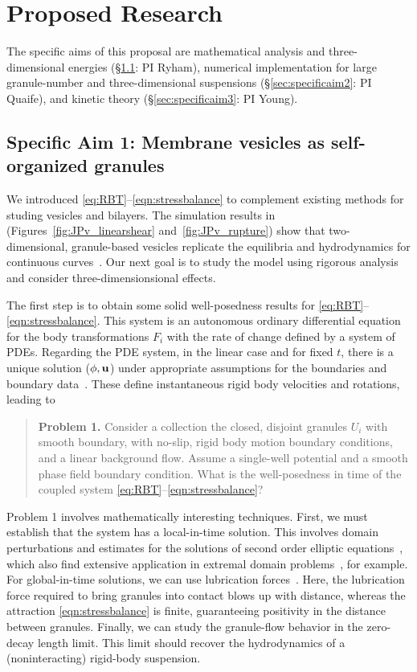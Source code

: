\section{Proposed Research}
\label{sec:proposed-work}
The specific aims of this proposal are
mathematical analysis and three-dimensional energies
(\S \ref{sec:specificaim1}: PI Ryham),
numerical implementation for large granule-number
and three-dimensional suspensions
(\S \ref{sec:specificaim2}: PI Quaife),
and kinetic theory
(\S \ref{sec:specificaim3}: PI Young).
\subsection{Specific Aim 1: Membrane vesicles as self-organized granules}
\label{sec:specificaim1}
We introduced \eqref{eq:RBT}--\eqref{eqn:stressbalance} to complement
existing methods for studing vesicles and bilayers. The simulation
results in (Figures~\ref{fig:JPv_linearshear} and~\ref{fig:JPv_rupture})
show that two-dimensional, granule-based vesicles replicate the
equilibria and hydrodynamics for continuous curves~\cite{FuQuRyYo22,
Fu2018_SIAM}. Our next goal is to study the model using rigorous
analysis and consider three-dimensionsional effects. 

The first step is to obtain some solid well-posedness results for
\eqref{eq:RBT}--\eqref{eqn:stressbalance}. This system is an autonomous
ordinary differential equation for the body transformations $F_i$ with
the rate of change defined by a system of PDEs. Regarding the PDE system,
in the linear case and for fixed $t$, there is a
unique solution ($\phi, \mathbf{u}$) under appropriate assumptions for the
boundaries and boundary data~\cite{manasthesis, rac-gre2016, LAX}. These
define instantaneous rigid body velocities and rotations,
leading to 
\begin{quotation}
  \noindent
  \textbf{Problem 1.} 
  Consider a collection the closed, disjoint granules $U_i$ with smooth
  boundary, with no-slip, rigid body motion boundary conditions, and a
  linear background flow. Assume a single-well potential and a smooth
  phase field boundary condition. What is the well-posedness in time of
  the coupled system \eqref{eq:RBT}--\eqref{eqn:stressbalance}?
\end{quotation}
Problem 1 involves mathematically interesting techniques. First, we
must establish that the system has a local-in-time solution. This
involves domain perturbations and estimates for the solutions of second
order elliptic equations~\cite{Savar2002DomainPA, DANERS20081,
Lamboley2015EstimatesOF}, which also find extensive application in
extremal domain problems~\cite{Schiffer1954VariationOD,
Henrot2006ExtremumPF, bogosel:hal-03607776,Bogosel2022OnTP}, for
example. For global-in-time solutions, we can 
use lubrication forces~\cite{cawthorn_balmforth_2010, leal_2007}.
Here, the lubrication force required to bring granules into contact
blows up with distance, whereas the attraction \eqref{eqn:stressbalance}
is finite, guaranteeing positivity in the distance between granules.
Finally, we can study the granule-flow behavior in the zero-decay length
limit. This limit should recover the hydrodynamics of a (noninteracting)
rigid-body suspension. 

